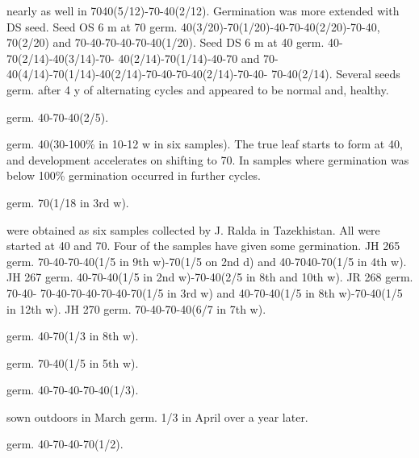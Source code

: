 \begin{description}
nearly as well in 7040(5/12)-70-40(2/12). Germination was more extended with DS
seed. Seed OS 6 m at 70 germ. 40(3/20)-70(1/20)-40-70-40(2/20)-70-40, 70(2/20)
and 70-40-70-40-70-40(1/20). Seed DS 6 m at 40 germ. 40-70(2/14)-40(3/14)-70-
40(2/14)-70(1/14)-40-70 and 70-40(4/14)-70(1/14)-40(2/14)-70-40-70-40(2/14)-70-40-
70-40(2/14). Several seeds germ. after 4 y of alternating cycles and appeared to be
normal and, healthy.
\item[J. kuschakewiczii] germ. 40-70-40(2/5).
\item[J. magnifica] germ. 40(30-100\% in 10-12 w in six samples). The true leaf starts
to form at 40, and development accelerates on shifting to 70. In samples where
germination was below 100\% germination occurred in further cycles.

\item[J. orchioides] germ. 70(1/18 in 3rd w).
\item[J. sp.] were obtained as six samples collected by J. Ralda in Tazekhistan. All
were started at 40 and 70. Four of the samples have given some germination. JH 265
germ. 70-40-70-40(1/5 in 9th w)-70(1/5 on 2nd d) and 40-7040-70(1/5 in 4th w). JH
267 germ. 40-70-40(1/5 in 2nd w)-70-40(2/5 in 8th and 10th w). JR 268 germ. 70-40-
70-40-70-40-70-40-70(1/5 in 3rd w) and 40-70-40(1/5 in 8th w)-70-40(1/5 in 12th w).
JH 270 germ. 70-40-70-40(6/7 in 7th w).
\item[J. stenophylla v. allisonii] germ. 40-70(1/3 in 8th w).
\item[J. subdecolorata] germ. 70-40(1/5 in 5th w).
\item[J. vicaria] germ. 40-70-40-70-40(1/3).
\item[J. wilmottiana] sown outdoors in March germ. 1/3 in April over a year later.
\item[J. zaprajagejewii] germ. 40-70-40-70(1/2).

\end{description}
